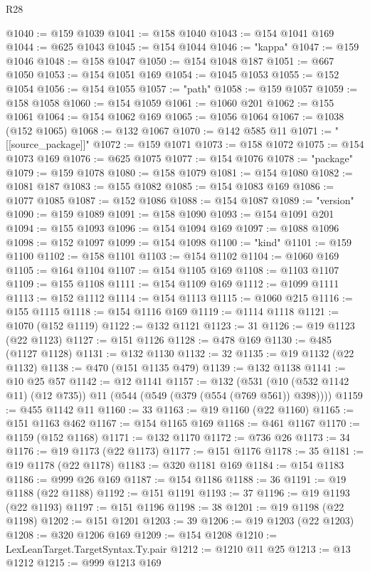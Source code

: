 \begin{lexlean}{R28}
\begin{coremodule}
@1040 := @159 @1039
@1041 := @158 @1040
@1043 := @154 @1041 @169
@1044 := @625 @1043
@1045 := @154 @1044
@1046 := "kappa"
@1047 := @159 @1046
@1048 := @158 @1047
@1050 := @154 @1048 @187
@1051 := @667 @1050
@1053 := @154 @1051 @169
@1054 := @1045 @1053
@1055 := @152 @1054
@1056 := @154 @1055
@1057 := "path"
@1058 := @159 @1057
@1059 := @158 @1058
@1060 := @154 @1059
@1061 := @1060 @201
@1062 := @155 @1061
@1064 := @154 @1062 @169
@1065 := @1056 @1064
@1067 := @1038 (@152 @1065)
@1068 := @132 @1067
@1070 := @142 @585 @11
@1071 := "[[source_package]]"
@1072 := @159 @1071
@1073 := @158 @1072
@1075 := @154 @1073 @169
@1076 := @625 @1075
@1077 := @154 @1076
@1078 := "package"
@1079 := @159 @1078
@1080 := @158 @1079
@1081 := @154 @1080
@1082 := @1081 @187
@1083 := @155 @1082
@1085 := @154 @1083 @169
@1086 := @1077 @1085
@1087 := @152 @1086
@1088 := @154 @1087
@1089 := "version"
@1090 := @159 @1089
@1091 := @158 @1090
@1093 := @154 @1091 @201
@1094 := @155 @1093
@1096 := @154 @1094 @169
@1097 := @1088 @1096
@1098 := @152 @1097
@1099 := @154 @1098
@1100 := "kind"
@1101 := @159 @1100
@1102 := @158 @1101
@1103 := @154 @1102
@1104 := @1060 @169
@1105 := @164 @1104
@1107 := @154 @1105 @169
@1108 := @1103 @1107
@1109 := @155 @1108
@1111 := @154 @1109 @169
@1112 := @1099 @1111
@1113 := @152 @1112
@1114 := @154 @1113
@1115 := @1060 @215
@1116 := @155 @1115
@1118 := @154 @1116 @169
@1119 := @1114 @1118
@1121 := @1070 (@152 @1119)
@1122 := @132 @1121
@1123 := 31
@1126 := @19 @1123 (@22 @1123)
@1127 := @151 @1126
@1128 := @478 @169
@1130 := @485 (@1127 @1128)
@1131 := @132 @1130
@1132 := 32
@1135 := @19 @1132 (@22 @1132)
@1138 := @470 (@151 @1135 @479)
@1139 := @132 @1138
@1141 := @10 @25 @57
@1142 := @12 @1141
@1157 := @132
    (@531 (@10 (@532 @1142 @11) (@12 @735)) @11 (@544 (@549 (@379 (@554 (@769 @561)) @398))))
@1159 := @455 @1142 @11
@1160 := 33
@1163 := @19 @1160 (@22 @1160)
@1165 := @151 @1163 @462
@1167 := @154 @1165 @169
@1168 := @461 @1167
@1170 := @1159 (@152 @1168)
@1171 := @132 @1170
@1172 := @736 @26
@1173 := 34
@1176 := @19 @1173 (@22 @1173)
@1177 := @151 @1176
@1178 := 35
@1181 := @19 @1178 (@22 @1178)
@1183 := @320 @1181 @169
@1184 := @154 @1183
@1186 := @999 @26 @169
@1187 := @154 @1186
@1188 := 36
@1191 := @19 @1188 (@22 @1188)
@1192 := @151 @1191
@1193 := 37
@1196 := @19 @1193 (@22 @1193)
@1197 := @151 @1196
@1198 := 38
@1201 := @19 @1198 (@22 @1198)
@1202 := @151 @1201
@1203 := 39
@1206 := @19 @1203 (@22 @1203)
@1208 := @320 @1206 @169
@1209 := @154 @1208
@1210 := LexLeanTarget.TargetSyntax.Ty.pair
@1212 := @1210 @11 @25
@1213 := @13 @1212
@1215 := @999 @1213 @169

\end{coremodule}
\end{lexlean}
